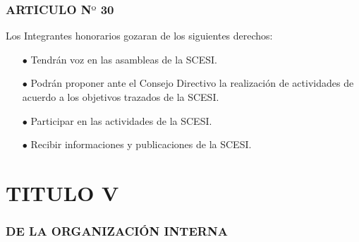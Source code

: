 \documentclass[11pt,letterpaper]{book}
\begin{document}
\subsubsection*{ARTICULO N$º$ 30}
Los Integrantes honorarios gozaran de los siguientes derechos: 
\begin{itemize}
\item[$\bullet$] Tendrán voz en las asambleas de la SCESI.  
\item[$\bullet$] Podrán proponer ante el Consejo Directivo la realización de actividades de acuerdo a los objetivos trazados de la SCESI. 
\item[$\bullet$] Participar en las actividades de la SCESI. 
\item[$\bullet$] Recibir informaciones y publicaciones de la SCESI. 
\end{itemize}
\section*{TITULO V}
\subsubsection*{DE LA ORGANIZACIÓN INTERNA}
\end{document}
